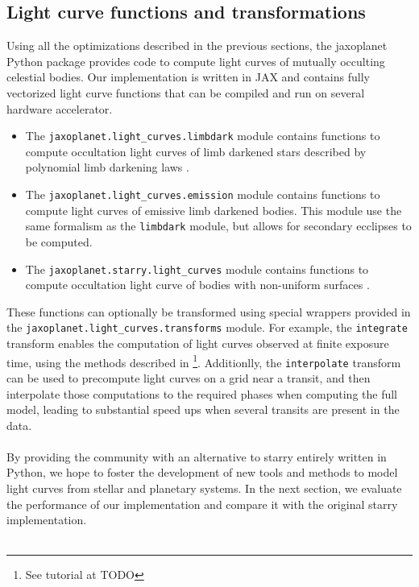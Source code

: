 \documentclass[modern]{aastex631}
\begin{document}
\subsection{Light curve functions and transformations}
Using all the optimizations described in the previous sections, the \textsf{jaxoplanet} Python package provides code to compute light curves of mutually occulting celestial bodies. Our implementation is written in \textsf{JAX} and contains fully vectorized light curve functions that can be compiled and run on several hardware accelerator. 
\begin{itemize}
    \item The \texttt{jaxoplanet.light\_curves.limbdark} module contains functions to compute  occultation light curves of limb darkened stars described by polynomial limb darkening laws \citep{Agol2020}.
    \item The \texttt{jaxoplanet.light\_curves.emission} module contains functions to compute light curves of emissive limb darkened bodies. This module use the same formalism as the \texttt{limbdark} module, but allows for secondary ecclipses to be computed.
    \item The \texttt{jaxoplanet.starry.light\_curves} module contains functions to compute occultation light curve of bodies with non-uniform surfaces \citep{starry}.
\end{itemize}
These functions can optionally be transformed using special wrappers provided in the \texttt{jaxoplanet.light\_curves.transforms}  module. For example, the \texttt{integrate} transform enables the computation of light curves observed at finite exposure time, using the methods described in \cite{Kipping2010}\footnote{See tutorial at TODO}. Additionlly, the \texttt{interpolate} transform can be used to precompute light curves on a grid near a transit, and then interpolate those computations to the required phases when computing the full model, leading to substantial speed ups when several transits are present in the data.\\\\
By providing the community with an alternative to \textsf{starry} entirely written in Python, we hope to foster the development of new tools and methods to model light curves from stellar and planetary systems. In the next section, we evaluate the performance of our implementation and compare it with the original \textsf{starry} implementation.\\\\
\end{document}
